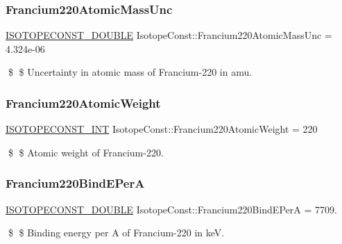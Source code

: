 \subsubsection{\texorpdfstring{Francium220\+Atomic\+Mass\+Unc}{Francium220AtomicMassUnc}}
{\footnotesize\ttfamily \mbox{\hyperlink{group___isotope_const-_macros_ga8f45a7272ce02c0b4c65c44636ed719a}{I\+S\+O\+T\+O\+P\+E\+C\+O\+N\+S\+T\+\_\+\+D\+O\+U\+B\+LE}} Isotope\+Const\+::\+Francium220\+Atomic\+Mass\+Unc = 4.\+324e-\/06}

\$ \$ Uncertainty in atomic mass of Francium-\/220 in amu. \mbox{\label{group___isotope_const-_francium-_fr220_gab1df60576c1418d23735743c8a5bd2fb}} 
\subsubsection{\texorpdfstring{Francium220\+Atomic\+Weight}{Francium220AtomicWeight}}
{\footnotesize\ttfamily \mbox{\hyperlink{group___isotope_const-_macros_ga5f18360b3e99483a35c32d789e62621c}{I\+S\+O\+T\+O\+P\+E\+C\+O\+N\+S\+T\+\_\+\+I\+NT}} Isotope\+Const\+::\+Francium220\+Atomic\+Weight = 220}

\$ \$ Atomic weight of Francium-\/220. \mbox{\label{group___isotope_const-_francium-_fr220_ga52ad59aa45a0151483c4233b2349140b}} 
\subsubsection{\texorpdfstring{Francium220\+Bind\+E\+PerA}{Francium220BindEPerA}}
{\footnotesize\ttfamily \mbox{\hyperlink{group___isotope_const-_macros_ga8f45a7272ce02c0b4c65c44636ed719a}{I\+S\+O\+T\+O\+P\+E\+C\+O\+N\+S\+T\+\_\+\+D\+O\+U\+B\+LE}} Isotope\+Const\+::\+Francium220\+Bind\+E\+PerA = 7709.}

\$ \$ Binding energy per A of Francium-\/220 in keV. \mbox{\label{group___isotope_const-_francium-_fr220_gaab9fef4066bec114bbd33596804ecbf6}} 
